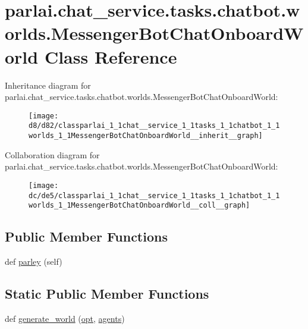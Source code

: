 \hypertarget{classparlai_1_1chat__service_1_1tasks_1_1chatbot_1_1worlds_1_1MessengerBotChatOnboardWorld}{}\section{parlai.\+chat\+\_\+service.\+tasks.\+chatbot.\+worlds.\+Messenger\+Bot\+Chat\+Onboard\+World Class Reference}
\label{classparlai_1_1chat__service_1_1tasks_1_1chatbot_1_1worlds_1_1MessengerBotChatOnboardWorld}


Inheritance diagram for parlai.\+chat\+\_\+service.\+tasks.\+chatbot.\+worlds.\+Messenger\+Bot\+Chat\+Onboard\+World\+:
\nopagebreak
\begin{figure}[H]
\begin{center}
\leavevmode
\texttt{[image: d8/d82/classparlai\_1\_1chat\_\_service\_1\_1tasks\_1\_1chatbot\_1\_1worlds\_1\_1MessengerBotChatOnboardWorld\_\_inherit\_\_graph]}
\end{center}
\end{figure}


Collaboration diagram for parlai.\+chat\+\_\+service.\+tasks.\+chatbot.\+worlds.\+Messenger\+Bot\+Chat\+Onboard\+World\+:
\nopagebreak
\begin{figure}[H]
\begin{center}
\leavevmode
\texttt{[image: dc/de5/classparlai\_1\_1chat\_\_service\_1\_1tasks\_1\_1chatbot\_1\_1worlds\_1\_1MessengerBotChatOnboardWorld\_\_coll\_\_graph]}
\end{center}
\end{figure}
\subsection*{Public Member Functions}
\begin{DoxyCompactItemize}
\item 
def \hyperlink{classparlai_1_1chat__service_1_1tasks_1_1chatbot_1_1worlds_1_1MessengerBotChatOnboardWorld_acbbffdf552a4a64144883d48cbf465ab}{parley} (self)
\end{DoxyCompactItemize}
\subsection*{Static Public Member Functions}
\begin{DoxyCompactItemize}
\item 
def \hyperlink{classparlai_1_1chat__service_1_1tasks_1_1chatbot_1_1worlds_1_1MessengerBotChatOnboardWorld_aa9eda82599dfd4735b207fbf5434251f}{generate\+\_\+world} (\hyperlink{classparlai_1_1core_1_1worlds_1_1World_a3640d92718acd3e6942a28c1ab3678bd}{opt}, \hyperlink{classparlai_1_1core_1_1worlds_1_1World_a728f75194cc26ea4035047c46cf62608}{agents})
\end{DoxyCompactItemize}
